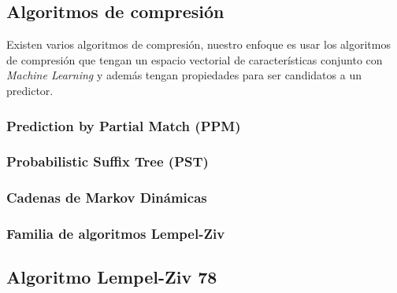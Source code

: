 \uncm
\subsection{Algoritmos de compresión}

Existen varios algoritmos de compresión, nuestro enfoque es usar los algoritmos de compresión que tengan un espacio vectorial de características conjunto con \emph{Machine Learning} y además tengan propiedades para ser candidatos a un predictor. 


\subsubsection{Prediction by Partial Match (PPM)}
	
 
\subsubsection{Probabilistic Suffix Tree (PST)}
 	

\subsubsection{Cadenas de Markov Dinámicas}
  	
 

\subsubsection{Familia de algoritmos Lempel-Ziv}\label{ch2:sec-lzfamily}
	



\uncm
\subsection{Algoritmo Lempel-Ziv 78}
	














